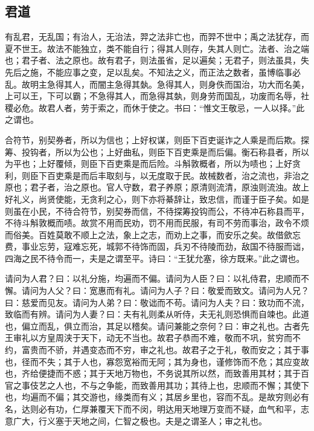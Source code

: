 \documentclass[]{article}
\begin{document}
\hypertarget{header-n56}{%
\subsection{君道}\label{header-n56}}

有乱君，无乱国；有治人，无治法，羿之法非亡也，而羿不世中；禹之法犹存，而夏不世王。故法不能独立，类不能自行；得其人则存，失其人则亡。法者、治之端也；君子者、法之原也。故有君子，则法虽省，足以遍矣；无君子，则法虽具，失先后之施，不能应事之变，足以乱矣。不知法之义，而正法之数者，虽博临事必乱。故明主急得其人，而闇主急得其埶。急得其人，则身佚而国治，功大而名美，上可以王，下可以霸；不急得其人，而急得其埶，则身劳而国乱，功废而名辱，社稷必危。故君人者，劳于索之，而休于使之。书曰：``惟文王敬忌，一人以择。''此之谓也。

合符节，别契券者，所以为信也；上好权谋，则臣下百吏诞诈之人乘是而后欺。探筹、投钩者，所以为公也；上好曲私，则臣下百吏乘是而后偏。衡石称县者，所以为平也；上好覆倾，则臣下百吏乘是而后险。斗斛敦概者，所以为啧也；上好贪利，则臣下百吏乘是而后丰取刻与，以无度取于民。故械数者，治之流也，非治之原也；君子者，治之原也。官人守数，君子养原；原清则流清，原浊则流浊。故上好礼义，尚贤使能，无贪利之心，则下亦将綦辞让，致忠信，而谨于臣子矣。如是则虽在小民，不待合符节，别契券而信，不待探筹投钩而公，不待冲石称县而平，不待斗斛敦概而啧。故赏不用而民劝，罚不用而民服，有司不劳而事治，政令不烦而俗美。百姓莫敢不顺上之法，象上之志，而劝上之事，而安乐之矣。故借歛忘费，事业忘劳，寇难忘死，城郭不待饰而固，兵刃不待陵而劲，敌国不待服而诎，四海之民不待令而一，夫是之谓至平。诗曰：``王犹允塞，徐方既来。''此之谓也。

请问为人君？曰：以礼分施，均遍而不偏。请问为人臣？曰：以礼侍君，忠顺而不懈。请问为人父？曰：宽惠而有礼。请问为人子？曰：敬爱而致文。请问为人兄？曰：慈爱而见友。请问为人弟？曰：敬诎而不苟。请问为人夫？曰：致功而不流，致临而有辨。请问为人妻？曰：夫有礼则柔从听侍，夫无礼则恐惧而自竦也。此道也，偏立而乱，俱立而治，其足以稽矣。请问兼能之奈何？曰：审之礼也。古者先王审礼以方皇周浃于天下，动无不当也。故君子恭而不难，敬而不巩，贫穷而不约，富贵而不骄，并遇变态而不穷，审之礼也。故君子之于礼，敬而安之；其于事也，径而不失；其于人也，寡怨宽裕而无阿；其为身也，谨修饰而不危；其应变故也，齐给便捷而不惑；其于天地万物也，不务说其所以然，而致善用其材；其于百官之事伎艺之人也，不与之争能，而致善用其功；其待上也，忠顺而不懈；其使下也，均遍而不偏；其交游也，缘类而有义；其居乡里也，容而不乱。是故穷则必有名，达则必有功，仁厚兼覆天下而不闵，明达用天地理万变而不疑，血气和平，志意广大，行义塞于天地之间，仁智之极也。夫是之谓圣人；审之礼也。
\end{document}
